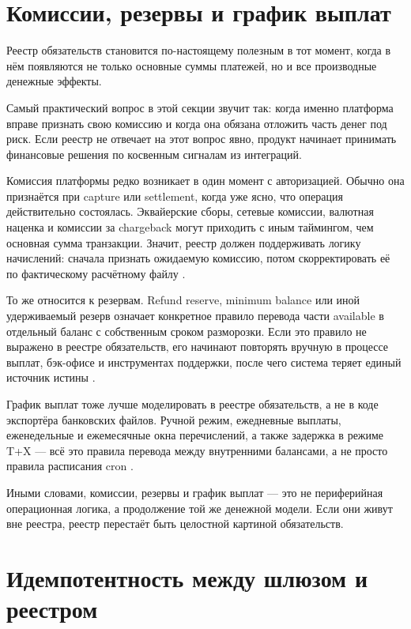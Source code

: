 \section{Комиссии, резервы и график выплат}
\label{sec:ledger-fees}

Реестр обязательств становится по-настоящему полезным в тот момент, когда
в нём появляются не только основные суммы платежей, но и все
производные денежные эффекты.

Самый практический вопрос в этой секции звучит так: когда именно
платформа вправе признать свою комиссию и когда она обязана
отложить часть денег под риск. Если реестр не отвечает на этот вопрос
явно, продукт начинает принимать финансовые решения по косвенным
сигналам из интеграций.

Комиссия платформы редко возникает в один момент с авторизацией.
Обычно она признаётся при capture или settlement, когда уже ясно,
что операция действительно состоялась. Эквайерские сборы, сетевые комиссии,
валютная наценка и комиссии за chargeback могут приходить с иным таймингом,
чем основная сумма транзакции. Значит, реестр должен поддерживать
логику начислений: сначала признать ожидаемую комиссию, потом
скорректировать её по фактическому расчётному файлу
\cite{visa-core-rules,mc-tpr,stripe-balances}.

То же относится к резервам. Refund reserve, minimum balance или иной
удерживаемый резерв означает конкретное правило перевода части available в отдельный баланс
с собственным сроком разморозки. Если это правило не выражено
в реестре обязательств, его начинают
повторять вручную в процессе выплат, бэк-офисе и инструментах поддержки,
после чего система теряет единый источник истины
\cite{stripe-minimum-balances,adyen-balances}.

График выплат тоже лучше моделировать в реестре обязательств, а не в коде
экспортёра банковских файлов. Ручной режим, ежедневные выплаты,
еженедельные и ежемесячные окна перечислений, а также задержка в режиме
T+X —
всё это правила перевода между внутренними балансами, а не просто
правила расписания cron \cite{stripe-payouts}.

Иными словами, комиссии, резервы и график выплат — это не периферийная
операционная логика, а продолжение той же денежной модели. Если они
живут вне реестра, реестр перестаёт быть целостной картиной обязательств.

\section{Идемпотентность между шлюзом и реестром}
\label{sec:ledger-idempotency}

